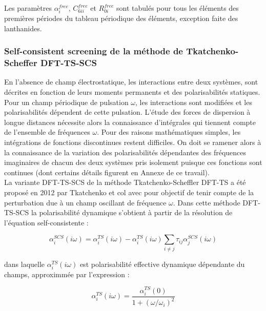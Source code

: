 Les paramètres $\alpha_{i}^{free}$, $C_{6ii}^{free}$ et $R_{0i}^{free}$ sont tabulés pour tous les éléments des premières périodes du tableau périodique des éléments, exception faite des lanthanides.


\subsubsection{Self-consistent screening de la méthode de Tkatchenko-Scheffer DFT-TS-SCS}

En l'absence de champ électrostatique, les interactions entre deux systèmes, sont décrites en fonction de leurs moments permanents et des polarisabilités statiques. Pour un champ périodique de pulsation $\omega$, les interactions sont modifiées et les polarisabilités dépendent de cette pulsation. L'étude des forces de dispersion à longue distances nécessite alors la connaissance d'intégrales qui tiennent compte de l'ensemble de fréquences $\omega$. Pour des raisons mathématiques simples, les intégrations de fonctions discontinues restent difficiles. On doit se ramener alors à la connaissance de la variation des polarisabilités dépendantes des fréquences imaginaires de chacun des deux systèmes pris isolement puisque ces fonctions sont continues (dont certains détails figurent en Annexe de ce travail). \\

La variante DFT-TS-SCS de la méthode Tkatchenko-Scheffler DFT-TS a été proposé en 2012 par Tkatchenko et col\cite{tkatchenko2012accurate} avec pour objectif de tenir compte de la perturbation due à un champ oscillant de fréquence $\omega$. Dans cette méthode DFT-TS-SCS la polarisabilité dynamique s'obtient à partir de la résolution de l’équation self-consistente :

\begin{equation}
\alpha_{i}^{SCS}(i \omega) = \alpha_{i}^{TS}(i \omega) - \alpha_{i}^{TS}(i \omega) \sum_{i\neq j} \tau_{ij} \alpha_{j}^{SCS}(i \omega)
\end{equation} 

dans laquelle $\alpha_{i}^{TS}(i \omega)$ est polarisabilité effective dynamique dépendante du champs, approximmée par l’expression : 

\begin{equation}
\alpha_{i}^{TS}(i \omega) = \frac{\alpha_{i}^{TS}(0)}{1 + (\omega/\omega_{i})^{2}}
\end{equation}

